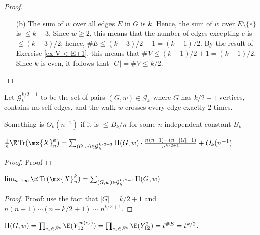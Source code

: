 \begin{lemma}
\begin{proof}
\begin{itemize}
    \item[(b)] The sum of $w$ over all edges $E$ in $G$ is $k$.  Hence, the sum of $w$ over $E\setminus\{e\}$ is $\le k-3$.  Since $w\ge 2$, this means that the number of edges excepting $e$ is $\le (k-3)/2$; hence, $\#E \le (k-3)/2+1 = (k-1)/2$.  By the result of Exercise \ref{ex V < E+1}, this means that $\#V \le (k-1)/2+1 = (k+1)/2$.  Since $k$ is even, it follows that $|G|=\#V \le k/2$.
  \end{itemize}
\end{proof}




\begin{def}
  \label{def:special_set_g}
  \notready
  Let $\mathcal{G}^{k/2+1}_k$ to be the set of pairs $(G,w)\in\mathcal{G}_k$ where $G$ has $k/2+1$ vertices, contains no self-edges, and the walk $w$ crosses every edge exactly $2$ times.
\end{def}


\begin{def}
  \label{def:big_o_with_base}
  \notready
  Something is $O_k(n^{-1})$ if it is $\le B_k/n$ for some $n$-independent constant $B_k$
\end{def}

\begin{proposition}
  \label{prop:eqn_4.7}
  \notready
  $\frac1n\E\Tr(\mx{X}_n^k) = \sum_{(G,w)\in\mathcal{G}^{k/2+1}_k} \Pi(G,w) \cdot \frac{n(n-1)\cdots(n-|G|+1)}{n^{k/2+1}} + O_k(n^{-1})$
\end{proposition}

\begin{proof}
  \notready
  Proof
\end{proof}




\begin{proposition}
  \label{prop:4.7.5}
  \notready
  $\lim_{n\to\infty}\E\Tr(\mx{X}_n^k) = \sum_{(G,w)\in\mathcal{G}^{k/2+1}_k} \Pi(G,w)$
\end{proposition}

\begin{proof}
  \notready
  Proof: use the fact that $|G|=k/2+1$ and $n(n-1)\cdots(n-k/2+1) \sim n^{k/2+1}$.
\end{proof}




\begin{proposition}
  \label{prop:eqn_4.8}
  \notready
  $\Pi(G,w) = \prod_{e_c\in E^c} \E(Y_{12}^{w(e_c)}) = \prod_{e_c\in E^c} \E(Y_{12}^2) = t^{\#E} = t^{k/2}$.
\end{proposition}


\end{lemma}
